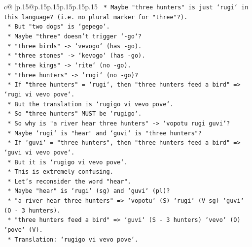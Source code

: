 \documentclass{article}
\begin{document}
{\begin{supertabular}{c@{$\;$}|p{.15\linewidth}@{}p{.15\linewidth}p{.15\linewidth}p{.15\linewidth}p{.15\linewidth}p{.15\linewidth}}
{{{\texttt{                        *   Maybe "three hunters" is just `rugi` in this language? (i.e. no plural marker for "three"?).} \\
\texttt{                        *   But "two dogs" is `gepego`.} \\
\texttt{                        *   Maybe "three" doesn't trigger `{-}go`?} \\
\texttt{                        *   "three birds" {-}> `vevogo` (has {-}go).} \\
\texttt{                        *   "three stones" {-}> `kevogo` (has {-}go).} \\
\texttt{                        *   "three kings" {-}> `rite` (no {-}go).} \\
\texttt{                        *   "three hunters" {-}> `rugi` (no {-}go)?} \\
\texttt{                        *   If "three hunters" = `rugi`, then "three hunters feed a bird" => `rugi vi vevo pove`.} \\
\texttt{                        *   But the translation is `rugigo vi vevo pove`.} \\
\texttt{                        *   So "three hunters" MUST be `rugigo`.} \\
\texttt{                        *   So why is "a river hear three hunters" {-}> `vopotu rugi guvi`?} \\
\texttt{                        *   Maybe `rugi` is "hear" and `guvi` is "three hunters"?} \\
\texttt{                        *   If `guvi` = "three hunters", then "three hunters feed a bird" => `guvi vi vevo pove`.} \\
\texttt{                        *   But it is `rugigo vi vevo pove`.} \\
\texttt{                        *   This is extremely confusing.} \\
\texttt{                        *   Let's reconsider the word "hear".} \\
\texttt{                        *   Maybe "hear" is `rugi` (sg) and `guvi` (pl)?} \\
\texttt{                        *   "a river hear three hunters" => `vopotu` (S) `rugi` (V sg) `guvi` (O {-} 3 hunters).} \\
\texttt{                        *   "three hunters feed a bird" => `guvi` (S {-} 3 hunters) `vevo` (O) `pove` (V).} \\
\texttt{                        *   Translation: `rugigo vi vevo pove`.} \\
}}}
\end{supertabular}}
\end{document}

